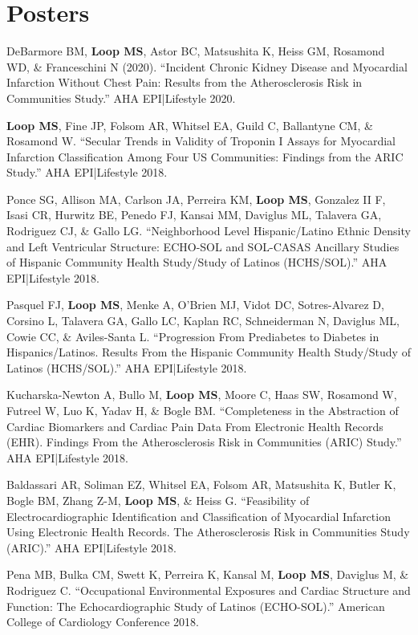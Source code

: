 \documentclass[10pt,letterpaper]{article}
\renewenvironment{itemize}{
  \begin{list}{}{
    \setlength{\leftmargin}{1.5em}
    \setlength{\itemsep}{0.25em}
    \setlength{\parskip}{0pt}
    \setlength{\parsep}{0.25em}
  }
}{
  \end{list}
}
\begin{document}
\section*{Posters}
\begin{itemize}
    \item DeBarmore BM, \textbf{Loop MS}, Astor BC, Matsushita K, Heiss GM, Rosamond WD, \& Franceschini N (2020). ``Incident Chronic Kidney Disease and Myocardial Infarction Without Chest Pain: Results from the Atherosclerosis Risk in Communities Study.'' AHA EPI|Lifestyle 2020.

    \item \textbf{Loop MS}, Fine JP, Folsom AR, Whitsel EA, Guild C, Ballantyne CM, \& Rosamond W. ``Secular Trends in Validity of Troponin I Assays for Myocardial Infarction Classification Among Four US Communities: Findings from the ARIC Study.'' AHA EPI|Lifestyle 2018.
    \item Ponce SG, Allison MA, Carlson JA, Perreira KM, \textbf{Loop MS}, Gonzalez II F, Isasi CR, Hurwitz BE, Penedo FJ, Kansai MM, Daviglus ML, Talavera GA, Rodriguez CJ, \& Gallo LG. ``Neighborhood Level Hispanic/Latino Ethnic Density and Left Ventricular Structure: ECHO-SOL and SOL-CASAS Ancillary Studies of Hispanic Community Health Study/Study of Latinos (HCHS/SOL).'' AHA EPI|Lifestyle 2018.
    \item Pasquel FJ, \textbf{Loop MS}, Menke A, O'Brien MJ, Vidot DC, Sotres-Alvarez D, Corsino L, Talavera GA, Gallo LC, Kaplan RC, Schneiderman N, Daviglus ML, Cowie CC, \& Aviles-Santa L. ``Progression From Prediabetes to Diabetes in Hispanics/Latinos. Results From the Hispanic Community Health Study/Study of Latinos (HCHS/SOL).'' AHA EPI|Lifestyle 2018.
    \item Kucharska-Newton A, Bullo M, \textbf{Loop MS}, Moore C, Haas SW, Rosamond W, Futreel W, Luo K, Yadav H, \& Bogle BM. ``Completeness in the Abstraction of Cardiac Biomarkers and Cardiac Pain Data From Electronic Health Records (EHR). Findings From the Atherosclerosis Risk in Communities (ARIC) Study.'' AHA EPI|Lifestyle 2018.
    \item Baldassari AR, Soliman EZ, Whitsel EA, Folsom AR, Matsushita K, Butler K, Bogle BM, Zhang Z-M, \textbf{Loop MS}, \& Heiss G. ``Feasibility of Electrocardiographic Identification and Classification of Myocardial Infarction Using Electronic Health Records. The Atherosclerosis Risk in Communities Study (ARIC).'' AHA EPI|Lifestyle 2018.
    \item Pena MB, Bulka CM, Swett K, Perreira K, Kansal M, \textbf{Loop MS}, Daviglus M, \& Rodriguez C. ``Occupational Environmental Exposures and Cardiac Structure and Function: The Echocardiographic Study of Latinos (ECHO-SOL).'' American College of Cardiology Conference 2018.

\end{itemize}
\end{document}
